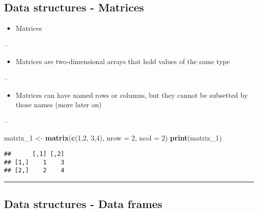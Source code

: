 \documentclass[]{article}
\newenvironment{Shaded}{\begin{snugshade}}{\end{snugshade}}
\newcommand{\DataTypeTok}[1]{\textcolor[rgb]{0.13,0.29,0.53}{#1}}
\newcommand{\DecValTok}[1]{\textcolor[rgb]{0.00,0.00,0.81}{#1}}
\newcommand{\KeywordTok}[1]{\textcolor[rgb]{0.13,0.29,0.53}{\textbf{#1}}}
\newcommand{\NormalTok}[1]{#1}
\newcommand{\StringTok}[1]{\textcolor[rgb]{0.31,0.60,0.02}{#1}}
\providecommand{\tightlist}{%
  \setlength{\itemsep}{0pt}\setlength{\parskip}{0pt}}
\begin{document}
\hypertarget{data-structures---matrices}{%
\subsection{Data structures -
Matrices}\label{data-structures---matrices}}

\begin{itemize}
\tightlist
\item
  Matrices
\end{itemize}

--

\begin{itemize}
\tightlist
\item
  Matrices are two-dimensional arrays that hold values of the same type
\end{itemize}

--

\begin{itemize}
\tightlist
\item
  Matrices can have named rows or columns, but they cannot be subsetted
  by those names (more later on)
\end{itemize}

--

\begin{Shaded}
\begin{Highlighting}[]
\NormalTok{matrix_}\DecValTok{1}\NormalTok{ <-}\StringTok{ }\KeywordTok{matrix}\NormalTok{(}\KeywordTok{c}\NormalTok{(}\DecValTok{1}\NormalTok{,}\DecValTok{2}\NormalTok{, }\DecValTok{3}\NormalTok{,}\DecValTok{4}\NormalTok{), }\DataTypeTok{nrow =} \DecValTok{2}\NormalTok{, }\DataTypeTok{ncol =} \DecValTok{2}\NormalTok{)}
\KeywordTok{print}\NormalTok{(matrix_}\DecValTok{1}\NormalTok{)}
\end{Highlighting}
\end{Shaded}

\begin{verbatim}
##      [,1] [,2]
## [1,]    1    3
## [2,]    2    4
\end{verbatim}

\begin{center}\rule{0.5\linewidth}{\linethickness}\end{center}

\hypertarget{data-structures---data-frames}{%
\subsection{Data structures - Data
frames}\label{data-structures---data-frames}}
\end{document}
